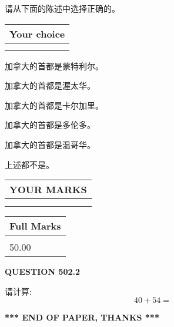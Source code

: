 \documentclass{ctexart}
\begin{document}
  
请从下面的陈述中选择正确的。
  
  
\noindent\hspace{3.0in} \begin{tabular}{|l|}
\hline
Your choice \\
\hline
 \\ 
 \\ 
\hline
\end{tabular}
  
  
 
 
加拿大的首都是蒙特利尔。
 
 
加拿大的首都是渥太华。
 
 
加拿大的首都是卡尔加里。
 
 
加拿大的首都是多伦多。
 
 
加拿大的首都是温哥华。
 
 
 上述都不是。
 
 
  
\vspace{0.2in}
  
\noindent\begin{tabular}{|l|}
\hline
 YOUR MARKS  \\
\hline
 \\ 
 \\ 
\hline
\end{tabular}
\hspace{0.05in} \begin{tabular}{|l|}
\hline
 Full Marks  \\
\hline
 \\ 
50.00 \\
\hline
\end{tabular}
{\textbf{\Large{QUESTION
502.2 
}}}
  
  
 
请计算:
\begin{equation}
40 +  %
54 = \nonumber
\end{equation}
 

 

 
   
   
 \vspace{0.2in}
 
   
   
   
   
\vspace{1.0in} 
{\textbf{\large{ *** END OF PAPER, THANKS *** }}} 
   
\end{document}
